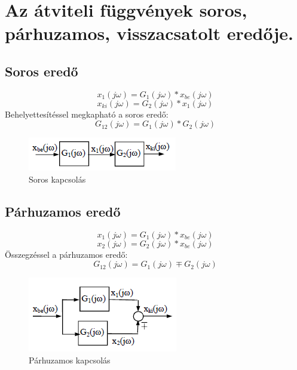 \documentclass[11pt,a4paper]{article}
\begin{document}
\section{Az átviteli függvények soros, párhuzamos, visszacsatolt eredője.}
\subsection{Soros eredő}
$$x_1\left(j\omega\right) = G_1\left(j\omega\right) * x_{be}\left(j\omega\right)$$
$$x_{ki}\left(j\omega\right) = G_2\left(j\omega\right) * x_1\left(j\omega\right)$$
Behelyettesítéssel megkapható a soros eredő:
$$G_{12}\left(j\omega\right) = G_1\left(j\omega\right) * G_2\left(j\omega\right)$$
\begin{figure}[hbtp]
    	 \centering
		\includegraphics[scale=1.0]{36_soros.png}
		\caption{Soros kapcsolás}
\end{figure}
\subsection{Párhuzamos eredő}
$$x_1\left(j\omega\right) = G_1\left(j\omega\right) * x_{be}\left(j\omega\right)$$
$$x_2\left(j\omega\right) = G_2\left(j\omega\right) * x_{be}\left(j\omega\right)$$
Összegzéssel a párhuzamos eredő:
$$G_{12}\left(j\omega\right) = G_1\left(j\omega\right) \mp G_2\left(j\omega\right)$$
\begin{figure}[hbtp]
    	 \centering
		\includegraphics[scale=1.0]{37_parhuzamos.png}
		\caption{Párhuzamos kapcsolás}
\end{figure}
\end{document}
